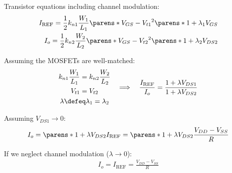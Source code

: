 \begin{multicols}{2}
\begin{CheatsheetEntryFrame}
        Transistor equations including channel modulation:
        \begin{align*}
            I_\text{REF}
            = \frac{1}{2} k_{n1} \frac{W_1}{L_1}
            \parens*{V_{GS} - V_{t1}}^2 \parens*{1 + \lambda_1 V_{GS}}
            \\
            I_o
            = \frac{1}{2} k_{n2} \frac{W_2}{L_2}
            \parens*{V_{GS} - V_{t2}}^2 \parens*{1 + \lambda_2 V_{DS2}}
        \end{align*}

        Assuming the MOSFETs are well-matched:
        \begin{gather*}
            \begin{gathered}
                k_{n1} \frac{W_1}{L_1} = k_{n2} \frac{W_2}{L_2}
                \\
                V_{t1} = V_{t2}
                \\
                \lambda \defeq \lambda_1 = \lambda_2
            \end{gathered}
            \quad\Longrightarrow\quad
            \frac{I_\text{REF}}{I_o}
            = \frac{1 + \lambda V_{DS1}}{1 + \lambda V_{DS2}}
        \end{gather*}

        Assuming $V_{DS1} \to 0$:
        \begin{gather*}
            I_o
            = \parens*{1 + \lambda V_{DS2}} I_\text{REF}
            = \parens*{1 + \lambda V_{DS2}} \frac{V_{DD} - V_{SS}}{R}
        \end{gather*}

        If we neglect channel modulation ($\lambda \to 0$):
        \begin{gather*}
            I_o = I_\text{REF} = \frac{V_{DD} - V_{SS}}{R}
        \end{gather*}


    \end{CheatsheetEntryFrame}

\end{multicols} %
